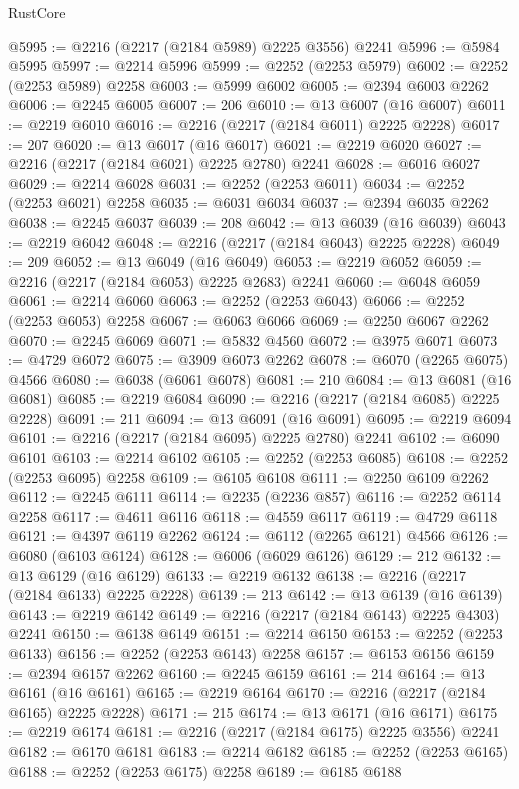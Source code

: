 \begin{lexlean}{RustCore}
\begin{coremodule}
@5995 := @2216 (@2217 (@2184 @5989) @2225 @3556) @2241
@5996 := @5984 @5995
@5997 := @2214 @5996
@5999 := @2252 (@2253 @5979)
@6002 := @2252 (@2253 @5989) @2258
@6003 := @5999 @6002
@6005 := @2394 @6003 @2262
@6006 := @2245 @6005
@6007 := 206
@6010 := @13 @6007 (@16 @6007)
@6011 := @2219 @6010
@6016 := @2216 (@2217 (@2184 @6011) @2225 @2228)
@6017 := 207
@6020 := @13 @6017 (@16 @6017)
@6021 := @2219 @6020
@6027 := @2216 (@2217 (@2184 @6021) @2225 @2780) @2241
@6028 := @6016 @6027
@6029 := @2214 @6028
@6031 := @2252 (@2253 @6011)
@6034 := @2252 (@2253 @6021) @2258
@6035 := @6031 @6034
@6037 := @2394 @6035 @2262
@6038 := @2245 @6037
@6039 := 208
@6042 := @13 @6039 (@16 @6039)
@6043 := @2219 @6042
@6048 := @2216 (@2217 (@2184 @6043) @2225 @2228)
@6049 := 209
@6052 := @13 @6049 (@16 @6049)
@6053 := @2219 @6052
@6059 := @2216 (@2217 (@2184 @6053) @2225 @2683) @2241
@6060 := @6048 @6059
@6061 := @2214 @6060
@6063 := @2252 (@2253 @6043)
@6066 := @2252 (@2253 @6053) @2258
@6067 := @6063 @6066
@6069 := @2250 @6067 @2262
@6070 := @2245 @6069
@6071 := @5832 @4560
@6072 := @3975 @6071
@6073 := @4729 @6072
@6075 := @3909 @6073 @2262
@6078 := @6070 (@2265 @6075) @4566
@6080 := @6038 (@6061 @6078)
@6081 := 210
@6084 := @13 @6081 (@16 @6081)
@6085 := @2219 @6084
@6090 := @2216 (@2217 (@2184 @6085) @2225 @2228)
@6091 := 211
@6094 := @13 @6091 (@16 @6091)
@6095 := @2219 @6094
@6101 := @2216 (@2217 (@2184 @6095) @2225 @2780) @2241
@6102 := @6090 @6101
@6103 := @2214 @6102
@6105 := @2252 (@2253 @6085)
@6108 := @2252 (@2253 @6095) @2258
@6109 := @6105 @6108
@6111 := @2250 @6109 @2262
@6112 := @2245 @6111
@6114 := @2235 (@2236 @857)
@6116 := @2252 @6114 @2258
@6117 := @4611 @6116
@6118 := @4559 @6117
@6119 := @4729 @6118
@6121 := @4397 @6119 @2262
@6124 := @6112 (@2265 @6121) @4566
@6126 := @6080 (@6103 @6124)
@6128 := @6006 (@6029 @6126)
@6129 := 212
@6132 := @13 @6129 (@16 @6129)
@6133 := @2219 @6132
@6138 := @2216 (@2217 (@2184 @6133) @2225 @2228)
@6139 := 213
@6142 := @13 @6139 (@16 @6139)
@6143 := @2219 @6142
@6149 := @2216 (@2217 (@2184 @6143) @2225 @4303) @2241
@6150 := @6138 @6149
@6151 := @2214 @6150
@6153 := @2252 (@2253 @6133)
@6156 := @2252 (@2253 @6143) @2258
@6157 := @6153 @6156
@6159 := @2394 @6157 @2262
@6160 := @2245 @6159
@6161 := 214
@6164 := @13 @6161 (@16 @6161)
@6165 := @2219 @6164
@6170 := @2216 (@2217 (@2184 @6165) @2225 @2228)
@6171 := 215
@6174 := @13 @6171 (@16 @6171)
@6175 := @2219 @6174
@6181 := @2216 (@2217 (@2184 @6175) @2225 @3556) @2241
@6182 := @6170 @6181
@6183 := @2214 @6182
@6185 := @2252 (@2253 @6165)
@6188 := @2252 (@2253 @6175) @2258
@6189 := @6185 @6188

\end{coremodule}
\end{lexlean}

